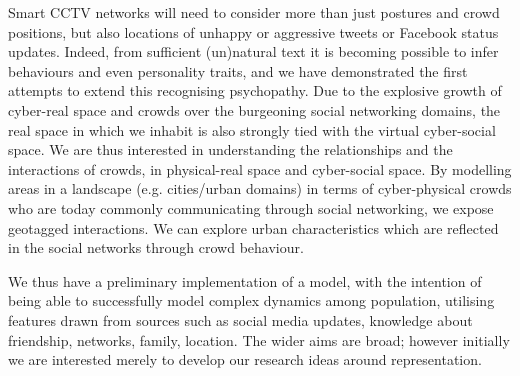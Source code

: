 \documentclass[conference]{IEEEtran}
\begin{document}
Smart CCTV networks will need to consider more than just postures and
crowd positions, but also locations of unhappy or aggressive tweets or
Facebook status updates. Indeed, from sufficient (un)natural text it
is becoming possible to infer behaviours and even personality traits,
and we have demonstrated the first attempts to extend this recognising
psychopathy. Due to the explosive growth of cyber-real space and
crowds over the burgeoning social networking domains, the real space
in which we inhabit is also strongly tied with the virtual
cyber-social space. We are thus interested in understanding the
relationships and the interactions of crowds, in physical-real space
and cyber-social space.  By modelling areas in a landscape
(e.g. cities/urban domains) in terms of cyber-physical crowds who are
today commonly communicating through social networking, we expose
geotagged interactions. We can explore urban characteristics which are
reflected in the social networks through crowd behaviour.

We thus have a preliminary implementation of a model, with the
intention of being able to successfully model complex dynamics among
population, utilising features drawn from sources such as social media
updates, knowledge about friendship, networks, family, location. The
wider aims are broad; however initially we are interested merely to
develop our research ideas around representation.






\end{document}
